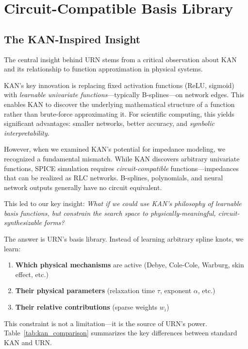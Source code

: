\documentclass{ieeeaccess}
\begin{document}
\section{Circuit-Compatible Basis Library}
\label{sec:basis}

\subsection{The KAN-Inspired Insight}

The central insight behind URN stems from a critical observation about KAN \cite{liu2024kan} and its relationship to function approximation in physical systems.

KAN's key innovation is replacing fixed activation functions (ReLU, sigmoid) with \textit{learnable univariate functions}---typically B-splines---on network edges. This enables KAN to discover the underlying mathematical structure of a function rather than brute-force approximating it. For scientific computing, this yields significant advantages: smaller networks, better accuracy, and \textit{symbolic interpretability}.

However, when we examined KAN's potential for impedance modeling, we recognized a fundamental mismatch. While KAN discovers arbitrary univariate functions, SPICE simulation requires \textit{circuit-compatible} functions---impedances that can be realized as RLC networks. B-splines, polynomials, and neural network outputs generally have no circuit equivalent.

This led to our key insight: \textit{What if we could use KAN's philosophy of learnable basis functions, but constrain the search space to physically-meaningful, circuit-synthesizable forms?}

The answer is URN's basis library. Instead of learning arbitrary spline knots, we learn:
\begin{enumerate}
\item \textbf{Which physical mechanisms} are active (Debye, Cole-Cole, Warburg, skin effect, etc.)
\item \textbf{Their physical parameters} (relaxation time $\tau$, exponent $\alpha$, etc.)
\item \textbf{Their relative contributions} (sparse weights $w_i$)
\end{enumerate}

This constraint is not a limitation---it is the source of URN's power. Table~\ref{tab:kan_comparison} summarizes the key differences between standard KAN and URN.
\end{document}

